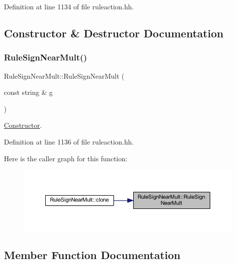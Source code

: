 Definition at line 1134 of file ruleaction.\+hh.



\subsection{Constructor \& Destructor Documentation}
\mbox{\label{class_rule_sign_near_mult_a30e94a171a736e659b64c7fdb37213aa}} 
\subsubsection{\texorpdfstring{RuleSignNearMult()}{RuleSignNearMult()}}
{\footnotesize\ttfamily Rule\+Sign\+Near\+Mult\+::\+Rule\+Sign\+Near\+Mult (\begin{DoxyParamCaption}\item[{const string \&}]{g }\end{DoxyParamCaption})\hspace{0.3cm}{\ttfamily [inline]}}



\mbox{\hyperlink{class_constructor}{Constructor}}. 



Definition at line 1136 of file ruleaction.\+hh.

Here is the caller graph for this function\+:
\nopagebreak
\begin{figure}[H]
\begin{center}
\leavevmode
\includegraphics[width=350pt]{class_rule_sign_near_mult_a30e94a171a736e659b64c7fdb37213aa_icgraph}
\end{center}
\end{figure}


\subsection{Member Function Documentation}
\mbox{\label{class_rule_sign_near_mult_a37aa70b7da5c91e0d7f8ea81a98869f6}} 
